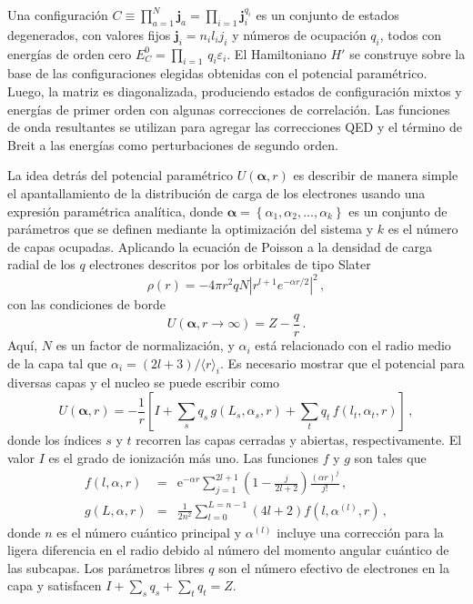 Una configuración 
$C\equiv\prod_{a=1}^N\mathbf{j}_a=\prod_{i=1}\mathbf{j}_i^{q_i}$ es un 
conjunto de estados degenerados, con valores fijos $\mathbf{j}_i=n_il_ij_i$
y números de ocupación $q_i$, todos con energías de orden cero 
$E_C^0=\prod_{i=1}\,q_i\varepsilon_i$. 
El Hamiltoniano $H'$ se construye sobre la base de las configuraciones 
elegidas obtenidas con el potencial paramétrico. Luego, la matriz es 
diagonalizada, produciendo estados de configuración mixtos y energías 
de primer orden con algunas correcciones de correlación. Las funciones 
de onda resultantes se utilizan para agregar las correcciones QED y el 
término de Breit a las energías como perturbaciones de segundo orden.

La idea detrás del potencial paramétrico $U(\boldsymbol{\alpha},r)$ es 
describir de manera simple el apantallamiento de la distribución de carga 
de los electrones usando una expresión paramétrica analítica, donde 
$\boldsymbol{\alpha}=\left\{\alpha_1,\alpha_2,\ldots,\alpha_k\right\}$ 
es un conjunto de parámetros que se definen mediante la optimización 
del sistema y $k$ es el número de capas ocupadas. Aplicando la ecuación de 
Poisson a la densidad de carga radial de los $q$ electrones descritos 
por los orbitales de tipo Slater
\begin{equation}
\rho(r) = -4\pi r^2 qN\left|r^{l+1}e^{-\alpha r/2}\right|^2\,,
\end{equation} 
con las condiciones de borde 
\begin{equation}
U(\boldsymbol{\alpha},r\rightarrow\infty)=Z-\frac{q}{r}\,.
\end{equation} 
Aquí, $N$ es un factor de normalización, y $\alpha_i$ está relacionado 
con el radio medio de la capa tal que $\alpha_i=(2l+3)/\langle r\rangle_i$. 
Es necesario mostrar que el potencial para diversas capas y el nucleo 
se puede escribir como
\begin{equation}
U(\boldsymbol{\alpha},r)=-\frac{1}{r} \left[I+\sum_s q_s\, g(L_s,\alpha_s,r) 
+ \sum_t q_t\,f(l_t,\alpha_t,r)\right]\,,
\label{eq:potparam}
\end{equation}
donde los índices $s$ y $t$ recorren las capas cerradas y abiertas, 
respectivamente. El valor $I$ es el grado de ionización más uno. 
Las funciones $f$ y $g$ son tales que
\begin{eqnarray}
f(l,\alpha,r)&=&\mathrm{e}^{-\alpha r} \sum_{j=1}^{2 l+1}\left(1-\frac{j}{2 l+2}\right) \frac{(\alpha r)^{j}}{j !}\,, \\
g(L, \alpha, r)&=&\frac{1}{2 n^{2}} \sum_{l=0}^{L=n-1}(4 l+2) f\left(l, \alpha^{(l)}, r\right)\,,
\end{eqnarray}
donde $n$ es el número cuántico principal y $\alpha^{(l)}$ incluye una
corrección para la ligera diferencia en el radio debido al número del
momento angular cuántico de las subcapas. 
Los parámetros libres $q$ son el número efectivo de electrones en la 
capa y satisfacen $I+\sum_{s} q_{s}+\sum_{t} q_{t}=Z$. 

